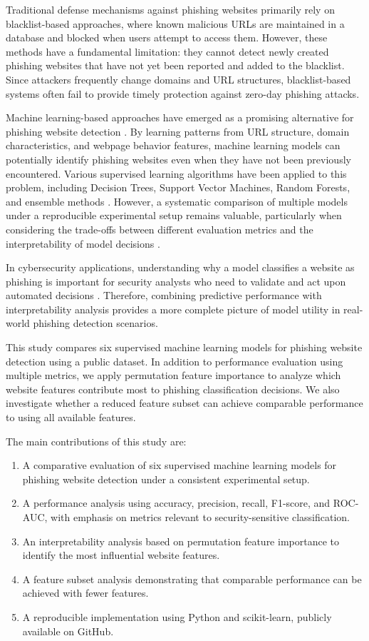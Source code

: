 \documentclass[conference]{IEEEtran}
\begin{document}
Traditional defense mechanisms against phishing websites primarily rely on blacklist-based approaches, where known malicious URLs are maintained in a database and blocked when users attempt to access them. However, these methods have a fundamental limitation: they cannot detect newly created phishing websites that have not yet been reported and added to the blacklist. Since attackers frequently change domains and URL structures, blacklist-based systems often fail to provide timely protection against zero-day phishing attacks.

Machine learning-based approaches have emerged as a promising alternative for phishing website detection \cite{sahingoz2019, chiew2021}. By learning patterns from URL structure, domain characteristics, and webpage behavior features, machine learning models can potentially identify phishing websites even when they have not been previously encountered. Various supervised learning algorithms have been applied to this problem, including Decision Trees, Support Vector Machines, Random Forests, and ensemble methods \cite{subasi2020, chatterjee2020, jain2019}. However, a systematic comparison of multiple models under a reproducible experimental setup remains valuable, particularly when considering the trade-offs between different evaluation metrics and the interpretability of model decisions \cite{chiew2021, do2022}.

In cybersecurity applications, understanding why a model classifies a website as phishing is important for security analysts who need to validate and act upon automated decisions \cite{arrieta2020}. Therefore, combining predictive performance with interpretability analysis provides a more complete picture of model utility in real-world phishing detection scenarios.

This study compares six supervised machine learning models for phishing website detection using a public dataset. In addition to performance evaluation using multiple metrics, we apply permutation feature importance to analyze which website features contribute most to phishing classification decisions. We also investigate whether a reduced feature subset can achieve comparable performance to using all available features.

The main contributions of this study are:
\begin{enumerate}
    \item A comparative evaluation of six supervised machine learning models for phishing website detection under a consistent experimental setup.
    \item A performance analysis using accuracy, precision, recall, F1-score, and ROC-AUC, with emphasis on metrics relevant to security-sensitive classification.
    \item An interpretability analysis based on permutation feature importance to identify the most influential website features.
    \item A feature subset analysis demonstrating that comparable performance can be achieved with fewer features.
    \item A reproducible implementation using Python and scikit-learn, publicly available on GitHub.
\end{enumerate}
\end{document}
